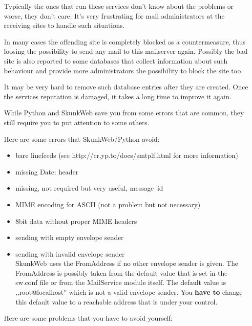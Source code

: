 \documentclass{article}
\begin{document}
Typically the ones that run these services don't know about the problems
or worse, they don't care. It's very frustrating for mail administrators
at the receiving sites to handle such situations.

In many cases the offending site is completely blocked as a countermeasure,
thus loosing the possibility to send any
mail to this mailserver again. Possibly the bad site is also reported
to some databases that collect information about such behaviour and
provide more administrators the possibility to block the site too.

It may be very hard to remove such database entries after they are created.
Once the services reputation is damaged, it takes a long time to improve
it again.

While Python and SkunkWeb save you from some errors that are common,
they still require you to put attention to some others.

Here are some errors that SkunkWeb/Python avoid:

\begin{itemize}
  \item bare linefeeds (see http://cr.yp.to/docs/smtplf.html for more
        information)
  \item missing Date: header
  \item missing, not required but very useful, message~id
  \item MIME encoding for ASCII (not a problem but not necessary)
  \item 8bit data without proper MIME headers
  \item sending with empty envelope sender
  \item sending with invalid envelope sender\\
        SkunkWeb uses the FromAddress if no other envelope sender
	is given. The FromAddress is possibly taken from the default
	value that is set in the sw.conf file or from the MailService module
	itself. The default value is ,,root@localhost'' which is not
	a valid envelope sender. You \textbf{have to} change this
	default value to a reachable address that is under your control.
\end{itemize}

Here are some problems that you have to avoid yourself:
\end{document}
